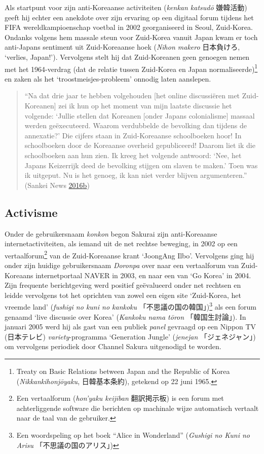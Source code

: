 \documentclass[10.5pt,dutch,]{article}
\begin{document}
Als startpunt voor zijn anti-Koreaanse activiteiten (\emph{kenkan
katsudō} 嫌韓活動) geeft hij echter een anekdote over zijn ervaring op
een digitaal forum tijdens het FIFA wereldkampioenschap voetbal in 2002
georganiseerd in Seoul, Zuid-Korea. Ondanks volgens hem massale steun
voor Zuid-Korea vanuit Japan kwam er toch anti-Japans sentiment uit
Zuid-Koreaanse hoek (\emph{Nihon makero} 日本負けろ, `verlies, Japan!').
Vervolgens stelt hij dat Zuid-Koreanen geen genoegen nemen met het
1964-verdrag (dat de relatie tussen Zuid-Korea en Japan
normaliseerde)\footnote{Treaty on Basic Relations between Japan and the
  Republic of Korea (\emph{Nikkankihonjōyaku}, 日韓基本条約), getekend
  op 22 juni 1965.} en zaken als het `troostmeisjes-probleem' onnodig
laten aanslepen.

\begin{quote}
``Na dat drie jaar te hebben volgehouden {[}het online discussiëren met
Zuid-Koreanen{]} zei ik hun op het moment van mijn laatste discussie het
volgende: `Jullie stellen dat Koreanen {[}onder Japans colonialisme{]}
massaal werden geëxecuteerd. Waarom verdubbelde de bevolking dan tijdens
de annexatie?' Die cijfers staan in Zuid-Koreaanse schoolboeken hoor! In
schoolboeken door de Koreaanse overheid gepubliceerd! Daarom liet ik die
schoolboeken aan hun zien. Ik kreeg het volgende antwoord: `Nee, het
Japans Keizerrijk deed de bevolking stijgen om slaven te maken.' Toen
was ik uitgeput. Nu is het genoeg, ik kan niet verder blijven
argumenteren.'' (Sankei News
\protect\hyperlink{ref-sankeiux5fnewsux5ftokyochiji-senux5f2016-1}{2016}\protect\hyperlink{ref-sankeiux5fnewsux5ftokyochiji-senux5f2016-1}{b})
\end{quote}

\subsection{Activisme}\label{activisme}

Onder de gebruikersnaam \emph{konkon} begon Sakurai zijn anti-Koreaanse
internetactiviteiten, als iemand uit de net rechtse beweging, in 2002 op
een vertaalforum\footnote{Een vertaalforum (\emph{hon'yaku keijiban}
  翻訳掲示板) is een forum met achterliggende software die berichten op
  machinale wijze automatisch vertaalt naar de taal van de gebruiker.}
van de Zuid-Koreaanse krant `JoongAng Ilbo'. Vervolgens ging hij onder
zijn huidige gebruikersnaam \emph{Doronpa} over naar een vertaalforum
van Zuid-Koreaans internetportaal NAVER in 2003, en naar een van `Go
Korea' in 2004. Zijn frequente berichtgeving werd positief geëvalueerd
onder net rechtsen en leidde vervolgens tot het oprichten van zowel een
eigen site `Zuid-Korea, het vreemde land' (\emph{fushigi no kuni no
kankoku} 「不思議の国の韓国」)\footnote{Een woordspeling op het boek
  ``Alice in Wonderland'' (\emph{Gushigi no Kuni no Arisu}
  「不思議の国のアリス」)} als een forum genaamd `live discussie over
Korea' (\emph{Kankoku nama tōron} 「韓国生討論」). In januari 2005 werd
hij als gast van een publiek \emph{panel} gevraagd op een Nippon TV
(日本テレビ) \emph{variety}-programma `Generation Jungle'
(\emph{jenejan} 「ジェネジャン」) om vervolgens periodiek door Channel
Sakura uitgenodigd te worden.
\end{document}
